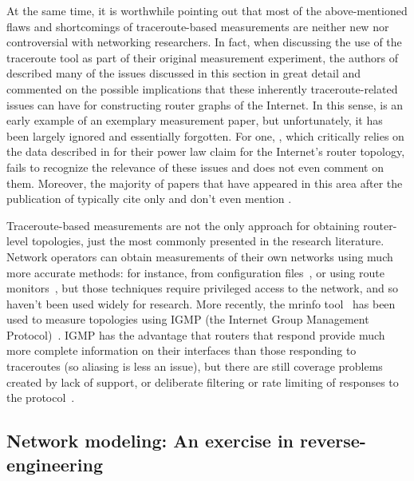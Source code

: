 At the same time, it is worthwhile pointing out that most of the
above-mentioned flaws and shortcomings of traceroute-based
measurements are neither new nor controversial with networking
researchers.  In fact, when discussing the use of the traceroute tool
as part of their original measurement experiment, the authors of  \cite{pansiot98:_inter} described many of the issues
discussed in this section in great detail and commented on the
possible implications that these inherently traceroute-related issues 
can have for constructing router graphs of the Internet. In this
sense, \cite{pansiot98:_inter} is an early example of an exemplary measurement paper,
but unfortunately, it has been largely ignored and essentially
forgotten.  For one,
\cite{faloutsos99:_power_law_relat_of_inter_topol}, which critically relies on the data
described in \cite{pansiot98:_inter} for their power law claim for the Internet's
router topology, fails to recognize the relevance of these issues and
does not even comment on them. Moreover, the majority of papers that
have appeared in this area after the publication of \cite{faloutsos99:_power_law_relat_of_inter_topol} typically
cite only \cite{faloutsos99:_power_law_relat_of_inter_topol} and don't even mention \cite{pansiot98:_inter}.


Traceroute-based measurements are not the only approach for obtaining
router-level topologies, just the most commonly presented in the
research literature. Network operators can obtain measurements of
their own networks using much more accurate methods: for instance,
from configuration files~\cite{feldmann00:_netscope}, or using route
monitors~\cite{shaikh01:_ospf}, but those techniques require
privileged access to the network, and so haven't been used widely for
research. More recently, the mrinfo tool~\cite{mrinfo} has been used
to measure topologies using IGMP (the Internet Group Management
Protocol)~\cite{merindol09:_quant_ases,pansiot10:_extrac}. IGMP has
the advantage that routers that respond provide much more complete
information on their interfaces than those responding to traceroutes
(so aliasing is less an issue), but there are still coverage problems
created by lack of support, or deliberate filtering or rate limiting
of responses to the protocol~\cite{marchetta12:_quant_igmp}. 
 
\subsection{Network modeling: An exercise in reverse-engineering}
\label{sec:router_models}

